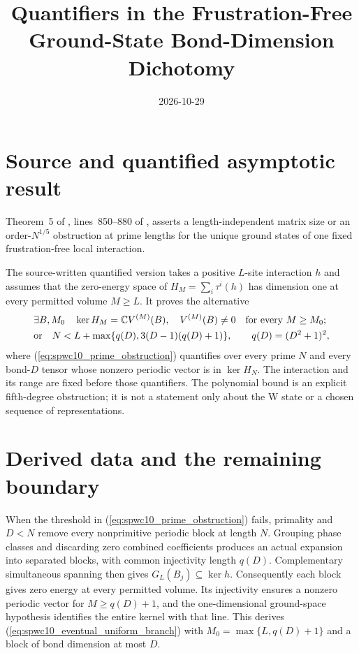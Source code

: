 \documentclass{article}
\title{Quantifiers in the Frustration-Free Ground-State Bond-Dimension Dichotomy}
\author{}
\date{2026-10-29}
\begin{document}
\maketitle
{}

\section{Source and quantified asymptotic result}

Theorem~5 of \cite{Sanz2010Quantum}, lines~850--880 of
, asserts a length-independent matrix size or
an order-$N^{1/5}$ obstruction at prime lengths for the unique ground states of
one fixed frustration-free local interaction.

The source-written quantified version takes a positive $L$-site interaction
$h$ and assumes that the zero-energy space of $H_M=\sum_i\tau^i(h)$ has
dimension one at every permitted volume $M\ge L$. It proves the alternative
\begin{align}
     & \exists B,M_0\quad
    \ker H_M=\mathbb{C} V^{(M)}(B),\quad V^{(M)}(B)\ne0
    \quad\text{for every }M\ge M_0; \label{eq:spwc10_eventual_uniform_branch} \\
     & \text{or}\quad
    N<L+\max\{q(D),3(D-1)(q(D)+1)\},\qquad
    q(D)=(D^2+1)^2, \label{eq:spwc10_prime_obstruction}
\end{align}
where (\ref{eq:spwc10_prime_obstruction}) quantifies over every prime $N$ and
every bond-$D$ tensor whose nonzero periodic vector is in $\ker H_N$.
The interaction and its range are fixed before those quantifiers. The
polynomial bound is an explicit fifth-degree obstruction; it is not a
statement only about the W state or a chosen sequence of representations.

\section{Derived data and the remaining boundary}

When the threshold in (\ref{eq:spwc10_prime_obstruction}) fails, primality and
$D<N$ remove every nonprimitive periodic block at length $N$. Grouping phase
classes and discarding zero combined coefficients produces an actual
expansion into separated blocks, with common injectivity length $q(D)$.
Complementary simultaneous spanning then gives $G_L(B_j)\subseteq\ker h$.
Consequently each block gives zero energy at every permitted volume. Its
injectivity ensures a nonzero periodic vector for $M\ge q(D)+1$, and the
one-dimensional ground-space hypothesis identifies the entire kernel with
that line. This derives (\ref{eq:spwc10_eventual_uniform_branch}) with
$M_0=\max\{L,q(D)+1\}$ and a block of bond dimension at most $D$.
\end{document}
